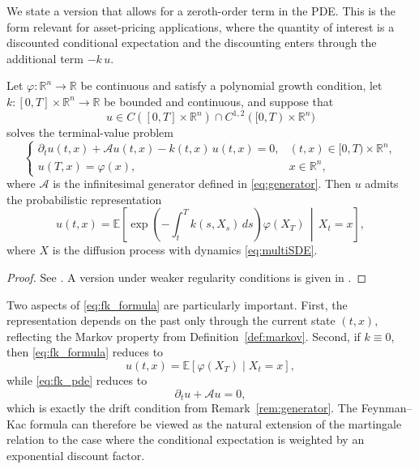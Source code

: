 We state a version that allows for a zeroth-order term in the PDE. This is the form relevant for asset-pricing applications, where the quantity of interest is a discounted conditional expectation and the discounting enters through the additional term $-k\,u$.

\begin{theorem}
\label{thm:fk}
Let $\varphi : \mathbb{R}^n \to \mathbb{R}$ be continuous and satisfy a polynomial growth condition, let $k : [0,T] \times \mathbb{R}^n \to \mathbb{R}$ be bounded and continuous, and suppose that
\[
u \in C([0,T]\times\mathbb{R}^n)\cap C^{1,2}([0,T)\times\mathbb{R}^n)
\]
solves the terminal-value problem
\begin{equation}
\begin{cases}
    \partial_t u(t,x)+\mathcal{A}u(t,x)-k(t,x)\,u(t,x)=0,
    & (t,x)\in[0,T)\times\mathbb{R}^n, \\[4pt]
    u(T,x)=\varphi(x),
    & x\in\mathbb{R}^n,
\end{cases}
\label{eq:fk_pde}
\end{equation}
where $\mathcal{A}$ is the infinitesimal generator defined in \eqref{eq:generator}. Then $u$ admits the probabilistic representation
\begin{equation}
u(t,x)
=
\mathbb{E}\!\left[
    \exp\!\left(-\int_t^T k(s,X_s)\,ds\right)\varphi(X_T)
    \,\middle|\,
    X_t=x
\right],
\label{eq:fk_formula}
\end{equation}
where $X$ is the diffusion process with dynamics \eqref{eq:multiSDE}.
\end{theorem}

\begin{proof}
See \citet[Prop.~5.6]{Bjork2020}. A version under weaker regularity conditions is given in \citet[Thm.~5.3]{Friedman1975}.
\end{proof}

Two aspects of \eqref{eq:fk_formula} are particularly important. First, the representation depends on the past only through the current state $(t,x)$, reflecting the Markov property from Definition~\ref{def:markov}. Second, if $k\equiv 0$, then \eqref{eq:fk_formula} reduces to
\[
u(t,x)=\mathbb{E}\!\left[\varphi(X_T)\mid X_t=x\right],
\]
while \eqref{eq:fk_pde} reduces to
\[
\partial_t u+\mathcal{A}u=0,
\]
which is exactly the drift condition from Remark~\ref{rem:generator}. The Feynman--Kac formula can therefore be viewed as the natural extension of the martingale relation to the case where the conditional expectation is weighted by an exponential discount factor.

